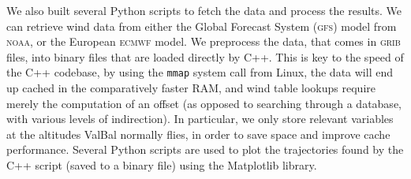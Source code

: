 \documentclass[11pt]{scrartcl} %
\begin{document}
We also built several Python scripts to fetch the data and process the results. We can retrieve wind data from either the Global Forecast System (\textsc{gfs}) model from \textsc{noaa}, or the European \textsc{ecmwf} model. We preprocess the data, that comes in \textsc{grib} files, into binary files that are loaded directly by C++. This is key to the speed of the C++ codebase, by using the \texttt{mmap} system call from Linux, the data will end up cached in the comparatively faster RAM, and wind table lookups require merely the computation of an offset (as opposed to searching through a database, with various levels of indirection). In particular, we only store relevant variables at the altitudes ValBal normally flies, in order to save space and improve cache performance. Several Python scripts are used to plot the trajectories found by the C++ script (saved to a binary file) using the Matplotlib library.
\end{document}
